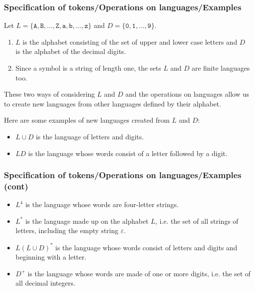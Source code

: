 %
\begin{frame}
\frametitle{Specification of tokens/Operations on languages/Examples}

Let \(L
= \{\texttt{A}, \texttt{B}, \ldots, \texttt{Z}, \texttt{a}, \texttt{b}, \ldots, \texttt{z}\}\)
and \(D = \{\texttt{0}, \texttt{1}, \ldots, \texttt{9}\}\).
\begin{enumerate}

  \item \(L\) is the alphabet consisting of the set of upper and lower
  case letters and \(D\) is the alphabet of the decimal digits.

  \item Since a symbol is a string of length one, the sets \(L\)
  and \(D\) are finite languages too.

\end{enumerate}
These two ways of considering \(L\) and \(D\) and the operations on
languages allow us to create new languages from other languages
defined by their alphabet.

\bigskip

Here are some examples of new languages created from \(L\) and \(D\):
\begin{itemize}

  \item \(L \cup D\) is the language of letters and digits.

  \item \(L D\) is the language whose words consist of a letter followed
  by a digit.

\end{itemize}

\end{frame}

%
\begin{frame}
\frametitle{Specification of tokens/Operations on languages/Examples
  (cont)}

\begin{itemize}

  \item \(L^{4}\) is the language whose words are four-letter strings.

  \item \(L^{*}\) is the language made up on the alphabet \(L\),
  i.e. the set of all strings of letters, including the empty
  string \(\varepsilon\).

  \item \(L(L \cup D)^{*}\) is the language whose words consist of
  letters and digits and beginning with a letter.

  \item \(D^{+}\) is the language whose words are made of one or more
  digits, i.e. the set of all decimal integers.

\end{itemize}

\end{frame}
